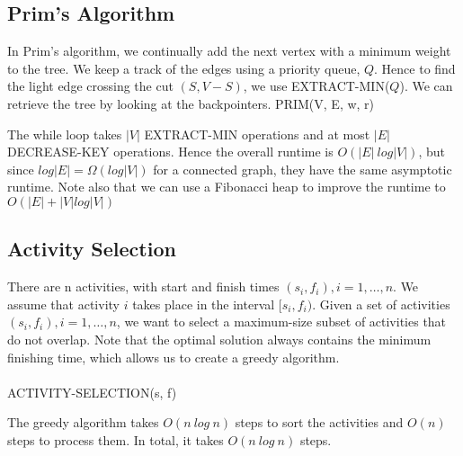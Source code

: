 \documentclass{article}
\begin{document}
    \subsection{Prim's Algorithm}
        In Prim's algorithm, we continually add the next vertex with a minimum weight to the tree. We keep a track of the edges using a priority queue, $Q$. Hence to find the light edge crossing the cut $(S, V - S)$, we use EXTRACT-MIN($Q$). We can retrieve the tree by looking at the backpointers.
        PRIM(V, E, w, r)
        \begin{algorithmic}[1]
            \EndFor
                    \EndIf
                \EndFor
            \EndWhile
        \end{algorithmic}
        The while loop takes $|V|$ EXTRACT-MIN operations and at most $|E|$ DECREASE-KEY operations. Hence the overall runtime is $O(|E|\: log |V|)$, but since $log |E| = \Omega(log|V|)$ for a connected graph, they have the same asymptotic runtime. Note also that we can use a Fibonacci heap to improve the runtime to $O(|E| + |V| log |V|)$
    \subsection{Activity Selection}
        There are n activities, with start and finish times $(s_i, f_i), i = 1, \dots, n$. We assume that activity $i$ takes place in the interval $ [s_i, f_i) $. Given a set of activities $(s_i, f_i), i = 1, \dots, n$, we want to select a maximum-size subset of activities that do not overlap. Note that the optimal solution always contains the minimum finishing time, which allows us to create a greedy algorithm.\\ \\
        ACTIVITY-SELECTION(s, f)
        \begin{algorithmic}
                \EndIf
            \EndFor
        \end{algorithmic}
        The greedy algorithm takes $O(n \: log \: n)$ steps to sort the activities and $O(n)$ steps to process them. In total, it takes $O(n \: log \: n)$ steps.
\end{document}
